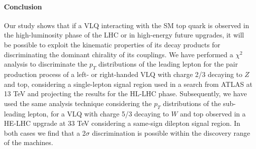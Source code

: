 \paragraph*{Conclusion}

Our study shows that if a VLQ interacting with the SM top quark is observed in the high-luminosity phase of the LHC or in high-energy future upgrades, it will be possible to exploit the kinematic properties of its decay products for discriminating the dominant chirality of its couplings. 
We have performed a $\chi^2$ analysis to discriminate the $p_T$ distributions of the leading lepton for the pair production process of a left- or right-handed VLQ with charge 2/3 decaying to $Z$ and top, considering a single-lepton signal region used in a search from ATLAS at 13 TeV and projecting the results for the HL-LHC phase. Subsequently, we have used the same analysis technique considering the $p_T$ distributions of the sub-leading lepton, for a VLQ with charge 5/3 decaying to $W$ and top observed in a HE-LHC upgrade at 33 TeV considering a same-sign dilepton signal region. In both cases we find that a 2$\sigma$ discrimination is possible within the discovery range of the machines.


